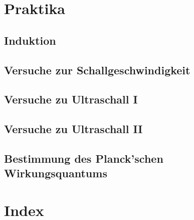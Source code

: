 \documentclass[a4paper,12pt,twoside,openany]{scrbook}
\begin{document}
\begin{appendix}



\part{Praktika}
\chapter{Induktion}


\chapter{Versuche zur Schallgeschwindigkeit}


\chapter{Versuche zu Ultraschall I}


\chapter{Versuche zu Ultraschall II}


\chapter{Bestimmung des Planck'schen Wirkungsquantums}




\part{Index}
 \chapter*{}
 \section*{}
 \subsection*{}
     


   \newcommand{\orgtheindex}{}
 \let\orgtheindex\theindex
 \let\orgendtheindex\endtheindex
 \def\theindex{%
	\def\twocolumn{\begin{multicols}{3}}%
	\def\onecolumn{}%
	\clearpage
	\orgtheindex
 }
 \def\endtheindex{%
	\end{multicols}%
	\orgendtheindex
	\clearpage
 }


\begin{footnotesize}
\printindex
\end{footnotesize}

\end{appendix}
\end{document}
